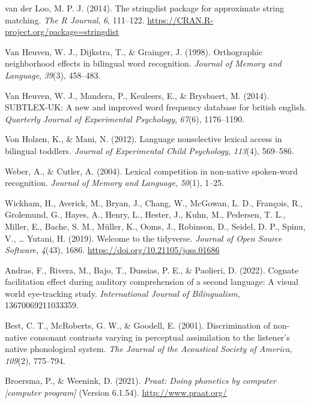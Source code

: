\documentclass[
]{article}
\newlength{\cslhangindent}
\newenvironment{CSLReferences}[2] %
 {\begin{list}{}{%
  \setlength{\itemindent}{0pt}
  \setlength{\leftmargin}{0pt}
  \setlength{\parsep}{0pt}
  \ifodd #1
   \setlength{\leftmargin}{\cslhangindent}
   \setlength{\itemindent}{-1\cslhangindent}
  \fi
  \setlength{\itemsep}{#2\baselineskip}}}
 {\end{list}}
\begin{document}
\begin{CSLReferences}{1}{0}
van der Loo, M. P. J. (2014). The stringdist package for approximate
string matching. \emph{The {R} {J}ournal}, \emph{6}, 111--122.
\url{https://CRAN.R-project.org/package=stringdist}

Van Heuven, W. J., Dijkstra, T., \& Grainger, J. (1998). Orthographic
neighborhood effects in bilingual word recognition. \emph{Journal of
Memory and Language}, \emph{39}(3), 458--483.

Van Heuven, W. J., Mandera, P., Keuleers, E., \& Brysbaert, M. (2014).
SUBTLEX-UK: A new and improved word frequency database for british
english. \emph{Quarterly Journal of Experimental Psychology},
\emph{67}(6), 1176--1190.

Von Holzen, K., \& Mani, N. (2012). Language nonselective lexical access
in bilingual toddlers. \emph{Journal of Experimental Child Psychology},
\emph{113}(4), 569--586.

Weber, A., \& Cutler, A. (2004). Lexical competition in non-native
spoken-word recognition. \emph{Journal of Memory and Language},
\emph{50}(1), 1--25.

Wickham, H., Averick, M., Bryan, J., Chang, W., McGowan, L. D.,
François, R., Grolemund, G., Hayes, A., Henry, L., Hester, J., Kuhn, M.,
Pedersen, T. L., Miller, E., Bache, S. M., Müller, K., Ooms, J.,
Robinson, D., Seidel, D. P., Spinu, V., \ldots{} Yutani, H. (2019).
Welcome to the {tidyverse}. \emph{Journal of Open Source Software},
\emph{4}(43), 1686. \url{https://doi.org/10.21105/joss.01686}

Andras, F., Rivera, M., Bajo, T., Dussias, P. E., \& Paolieri, D.
(2022). Cognate facilitation effect during auditory comprehension of a
second language: A visual world eye-tracking study. \emph{International
Journal of Bilingualism}, 13670069211033359.

Best, C. T., McRoberts, G. W., \& Goodell, E. (2001). Discrimination of
non-native consonant contrasts varying in perceptual assimilation to the
listener's native phonological system. \emph{The Journal of the
Acoustical Society of America}, \emph{109}(2), 775--794.

Broersma, P., \& Weenink, D. (2021). \emph{Praat: Doing phonetics by
computer {[}computer program{]}} (Version 6.1.54).
\url{http://www.praat.org/}


\end{CSLReferences}
\end{document}
